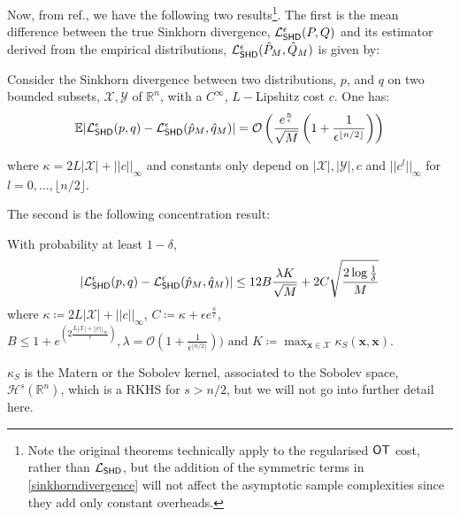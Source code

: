  
Now, from ref., we have the following two results\footnote{Note the original theorems technically apply to the regularised $\operatorname{\textsf{OT}}$ cost, rather than $\mathcal{L}_{\operatorname{\textsf{SHD}}}$, but the addition of the symmetric terms in \eqref{sinkhorndivergence} will not affect the asymptotic sample complexities since they add only constant overheads.}. The first is the mean difference between the true Sinkhorn divergence, $\mathcal{L}_{\operatorname{\textsf{SHD}}}^\epsilon(P, Q)$ and its estimator derived from the empirical distributions, $\mathcal{L}_{\operatorname{\textsf{SHD}}}^\epsilon(\hat{P}_M, \hat{Q}_M)$ is given by:
\begin{theorem}\label{thm:sinkhornexpectationsamplecomplexity_supp}
Consider the Sinkhorn divergence between two distributions, $p$, and $q$ on two bounded subsets, $\mathcal{X}, \mathcal{Y}$ of $\mathbb{R}^n$, with a $C^{\infty}$, $L-$Lipshitz cost $c$. One has:
\begin{align}
    \mathbb{E}|\mathcal{L}_{\operatorname{\textsf{SHD}}}^\epsilon(p,q) - \mathcal{L}_{\operatorname{\textsf{SHD}}}^\epsilon(\hat{p}_M, \hat{q}_M)| = \mathcal{O}\left(\frac{e^{\frac{\kappa}{\epsilon}}}{\sqrt{M}}\left(1+\frac{1}{\epsilon^{\lfloor n/2\rfloor}}\right)\right)\label{sinkhornexpectationsamplecomplexity_supp}
\end{align}


where $\kappa = 2L|\mathcal{X}|+||c||_{\infty}$ and constants only depend on $|\mathcal{X}|, |\mathcal{Y}|, c$ and $||c^{l}||_{\infty}$ for $l = 0, \dots, \lfloor n/2\rfloor$.
\end{theorem}
The second is the following concentration result:

\begin{corollary}
\label{thm:sinkhornconcentrationsamplecomplexity_supp}
With probability at least $1-\delta$,
\begin{align}
    |\mathcal{L}_{\operatorname{\textsf{SHD}}}^\epsilon(p,q) - \mathcal{L}_{\operatorname{\textsf{SHD}}}^\epsilon(\hat{p}_M, \hat{q}_M)| \leq 12B\frac{\lambda K}{\sqrt{M}} + 2C\sqrt{\frac{2\log\frac{1}{\delta}}{M}}\label{sinkhornconcentrationsamplecomplexity_supp}
\end{align}
where $\kappa  \coloneqq 2L|\mathcal{X}|+||c||_{\infty}$, $C  \coloneqq \kappa + \epsilon e^{\frac{\kappa}{\epsilon}}$, $B\leq 1+e^{\left(2\frac{L|\mathcal{X}|+||c||_{\infty}}{\epsilon}\right)}, \lambda = \mathcal{O}(1+ \frac{1}{\epsilon^{\lfloor n/2\rfloor}})) \text{ and } K  \coloneqq \max_{\mathbf{x} \in \mathcal{X}}\kappa_S(\mathbf{x}, \mathbf{x})$.
\end{corollary}
$\kappa_S$ is the Matern or the Sobolev kernel, associated to the Sobolev space, $\mathcal{H}^s(\mathbb{R}^n)$, which is a RKHS for $s > n/2$, but we will not go into further detail here.

